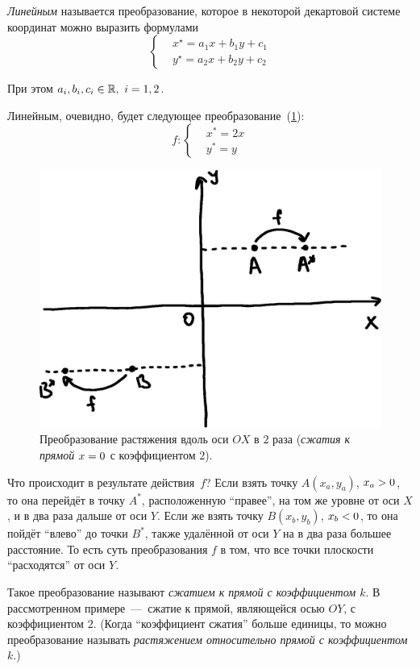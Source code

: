 \documentclass[a4paper,12pt]{article}
\begin{document}
  \begin{definition}
    \emph{Линейным} называется преобразование, которое в некоторой декартовой системе координат можно выразить формулами
    \begin{equation}
      \label{eq:linear}
      \left\{
        \begin{aligned}
          &x^\star = a_1 x + b_1 y + c_1\\
          &y^\star = a_2 x + b_2 y + c_2
        \end{aligned}
      \right.
    \end{equation}
    
    При этом $a_i, b_i, c_i \hm\in \RR,\ i = 1, 2$.
  \end{definition}
  
  \begin{example}
    Линейным, очевидно, будет следующее преобразование~(\ref{fig:linear-example}):
    \begin{equation}\label{eq:linear-example}
      f\colon \left\{
        \begin{aligned}
          &x^* = 2x\\
          &y^* = y
        \end{aligned}
      \right.
    \end{equation}
    
    \begin{figure}
      \centering
      
      \includegraphics[width=0.6\columnwidth]{linear-example}
      
      \caption{Преобразование растяжения вдоль оси $OX$ в $2$ раза (\emph{сжатия к прямой} $x \hm= 0$ с коэффициентом $2$).}
      \label{fig:linear-example}
    \end{figure}
    
    Что происходит в результате действия~$f$?
    Если взять точку $A(x_a, y_a)$, $x_a \hm> 0$, то она перейдёт в точку $A^*$, расположенную ``правее'', на том же уровне от оси $X$, и в два раза дальше от оси $Y$.
    Если же взять точку $B(x_b, y_b)$, $x_b \hm< 0$, то она пойдёт ``влево'' до точки $B^*$, также удалённой от оси $Y$ на в два раза большее расстояние.
    То есть суть преобразования $f$ в том, что все точки плоскости ``расходятся'' от оси $Y$.
    
    Такое преобразование называют \emph{сжатием к прямой с коэффициентом $k$}.
    В рассмотренном примере~---~сжатие к прямой, являющейся осью $OY$, с коэффициентом $2$.
    (Когда ``коэффициент сжатия'' больше единицы, то можно преобразование называть \emph{растяжением относительно прямой с коэффициентом $k$}.)
  \end{example}
  
\end{document}
